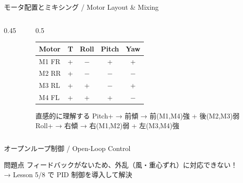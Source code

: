 \documentclass[aspectratio=169, 14pt]{beamer}
\begin{document}
\begin{frame}{モータ配置とミキシング / Motor Layout \& Mixing}
  \begin{columns}[T]
    \begin{column}{0.45\textwidth}
      \centering
      \resizebox{0.95\columnwidth}{!}{}
    \end{column}
    \begin{column}{0.5\textwidth}
      \begin{table}
        \centering\footnotesize
        \begin{tabular}{lcccc}
          \hline
          \textbf{Motor} & \textbf{T} & \textbf{Roll} & \textbf{Pitch} & \textbf{Yaw} \\
          \hline
          M1 FR & + & $-$ & + & + \\
          M2 RR & + & $-$ & $-$ & $-$ \\
          M3 RL & + & + & $-$ & + \\
          M4 FL & + & + & + & $-$ \\
          \hline
        \end{tabular}
      \end{table}

      \vspace{0.5em}

      \begin{exampleblock}{\footnotesize 直感的に理解する}
        \scriptsize
        Pitch+ → 前傾 → 前(M1,M4)強 + 後(M2,M3)弱\\
        Roll+ → 右傾 → 右(M1,M2)弱 + 左(M3,M4)強
      \end{exampleblock}
    \end{column}
  \end{columns}
\end{frame}

\begin{frame}{オープンループ制御 / Open-Loop Control}
  \begin{center}
    \resizebox{0.75\textwidth}{!}{}
  \end{center}

  \vspace{0.5em}

  \begin{alertblock}{問題点}
    フィードバックがないため、外乱（風・重心ずれ）に対応できない！\\
    → Lesson 5/8 で PID 制御を導入して解決
  \end{alertblock}
\end{frame}
\end{document}
